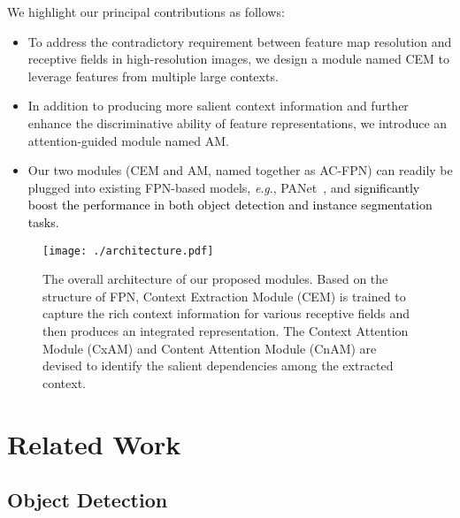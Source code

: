 \documentclass[journal]{IEEEtran}
\newcommand{\eg}{\textit{e}.\textit{g}.\xspace}
\def\myblue{\textcolor{black}}
\begin{document}
	
	We highlight our principal contributions as follows:
	\begin{itemize}
\item To address the contradictory requirement between feature map resolution and receptive fields in high-resolution images, we design a module named CEM to leverage features from multiple large contexts.
		\item In addition to producing more salient context information and further enhance the discriminative ability of feature representations, we introduce an attention-guided module named AM.
		\item Our two modules (CEM and AM, named together as AC-FPN) can readily be plugged into existing FPN-based models, \eg, PANet~\cite{liu2018path}, and 
		\myblue{significantly boost the performance in both object detection and instance segmentation tasks.}
\end{itemize}
	
	
	\begin{figure*}[t]
		\begin{center}
\texttt{[image: ./architecture.pdf]}
\end{center}
		\caption{The overall architecture of our proposed modules. Based on the structure of FPN, Context Extraction Module (CEM) is trained to capture the rich context information for various receptive fields and then produces an integrated representation. The Context Attention Module (CxAM) and Content Attention Module (CnAM) are devised to identify the salient dependencies among the extracted context.}
		\label{fig:architecture1}
	\end{figure*}
	
	
	\section{Related Work}
	
	\subsection{Object Detection}
	
\end{document}
